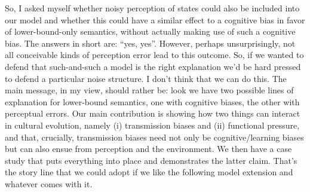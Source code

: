 \documentclass[fleqn,reqno,10pt]{article}
\begin{document}
So, I asked myself whether noisy perception of states could also be included into our model and
whether this could have a similar effect to a cognitive bias in favor of lower-bound-only
semantics, without actually making use of such a cognitive bias. The answers in short are:
``yes, yes''. However, perhaps unsurprisingly, not all conceivable kinds of perception error
lead to this outcome. So, if we wanted to defend that such-and-such a model is the right
explanation we'd be hard pressed to defend a particular noise structure. I don't think that we
can do this. The main message, in my view, should rather be: look we have two possible
lines of explanation for lower-bound semantics, one with cognitive biases, the other with
perceptual errors. Our main contribution is showing how two things can interact in cultural
evolution, namely (i) transmission biases and (ii) functional pressure, and that, crucially,
transmission biases need not only be cognitive/learning biases but can also ensue from
perception and the environment. We then have a case study that puts everything into place and
demonstrates the latter claim. That's the story line that we could adopt if we like the
following model extension and whatever comes with it.




\printbibliography[heading=bibintoc]
\end{document}
